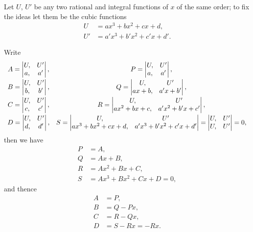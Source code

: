\documentclass[11pt,a4paper]{article}
\begin{document}
Let $U$, $U'$ be any two rational and integral functions of $x$ of the same order;
to fix the ideas let them be the cubic functions
\begin{align*}
U &= ax^3 + bx^2 + cx + d,\\
U' &= a'x^3 + b'x^2 + c'x + d'.
\end{align*}

Write
\[
\begin{array}{c@{\quad}c}
A = \begin{vmatrix} U, & U' \\ a, & a' \end{vmatrix}, &
P = \begin{vmatrix} U, & U' \\ a, & a' \end{vmatrix}, \\[2ex]
B = \begin{vmatrix} U, & U' \\ b, & b' \end{vmatrix}, &
Q = \begin{vmatrix} U, & U' \\ ax+b, & a'x+b' \end{vmatrix}, \\[2ex]
C = \begin{vmatrix} U, & U' \\ c, & c' \end{vmatrix}, &
R = \begin{vmatrix} U, & U' \\ ax^2+bx+c, & a'x^2+b'x+c' \end{vmatrix}, \\[2ex]
D = \begin{vmatrix} U, & U' \\ d, & d' \end{vmatrix}, &
S = \begin{vmatrix} U, & U' \\ ax^3+bx^2+cx+d, & a'x^3+b'x^2+c'x+d' \end{vmatrix} = \begin{vmatrix} U, & U' \\ U, & U' \end{vmatrix} = 0,
\end{array}
\]
then we have
\begin{align*}
P &= A,\\
Q &= Ax + B,\\
R &= Ax^2 + Bx + C,\\
S &= Ax^3 + Bx^2 + Cx + D = 0,
\end{align*}
and thence
\begin{align*}
A &= P,\\
B &= Q - Px,\\
C &= R - Qx,\\
D &= S - Rx = -Rx.
\end{align*}
\end{document}
